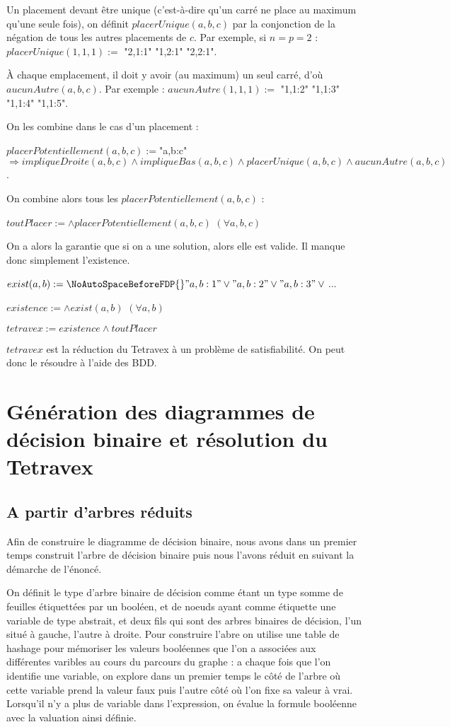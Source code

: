 \documentclass[11pt]{article}
\begin{document}
Un placement devant être unique (c'est-à-dire qu'un carré ne place au maximum qu'une seule fois), on définit $placerUnique(a, b, c)$ par la conjonction de la négation de tous les autres placements de $c$.
Par exemple, si $n = p = 2$ : $placerUnique(1, 1, 1) :=$ {\NoAutoSpaceBeforeFDP{} \neg "2,1:1" \land{} \neg "1,2:1" \land{} \neg "2,2:1"}.

À chaque emplacement, il doit y avoir (au maximum) un seul carré, d'où $aucunAutre(a, b, c)$.
Par exemple : $aucunAutre(1, 1, 1) :=$ {\NoAutoSpaceBeforeFDP{} \neg "1,1:2" \land{} \neg "1,1:3" \land{} \neg "1,1:4" \land{} \neg "1,1:5"}.

On les combine dans le cas d'un placement :

$placerPotentiellement(a, b, c) := ${\NoAutoSpaceBeforeFDP{}"a,b:c"}$ \Rightarrow{} impliqueDroite(a, b, c) \land{} impliqueBas(a, b, c) \land{} placerUnique(a, b, c) \land{} aucunAutre(a, b, c)$.

On combine alors tous les $placerPotentiellement(a, b, c)$ :

$toutPlacer := \land{} placerPotentiellement(a, b, c)$ $(\forall{} a, b, c)$

On a alors la garantie que si on a une solution, alors elle est valide.
Il manque donc simplement l'existence.

$exist(a, b) := {\NoAutoSpaceBeforeFDP{}"a,b:1" \lor{} "a,b:2" \lor{} "a,b:3" \lor{}}$...

$existence := \land{} exist(a, b)$ $(\forall{} a, b)$

$tetravex := existence \land{} toutPlacer$

$tetravex$ est la réduction du Tetravex à un problème de satisfiabilité. On peut donc le résoudre à l'aide des BDD.

\section{Génération des diagrammes de décision binaire et résolution du Tetravex}
\subsection{A partir d'arbres réduits}
Afin de construire le diagramme de décision binaire, nous avons dans un premier temps construit l'arbre de décision binaire puis nous l'avons réduit en suivant la démarche de l'énoncé.

On définit le type d'arbre binaire de décision comme étant un type somme de feuilles étiquettées par un booléen, et de noeuds ayant comme étiquette une variable de type abstrait, et deux fils qui sont des arbres binaires de décision, l'un situé à gauche, l'autre à droite. Pour construire l'abre on utilise une table de hashage pour mémoriser les valeurs booléennes que l'on a associées aux différentes varibles au cours du parcours du graphe : a chaque fois que l'on identifie une variable, on explore dans un premier temps le côté de l'arbre où cette variable prend la valeur faux puis l'autre côté où l'on fixe sa valeur à vrai. Lorsqu'il n'y a plus de variable dans l'expression, on évalue la formule booléenne avec la valuation ainsi définie.
\end{document}
